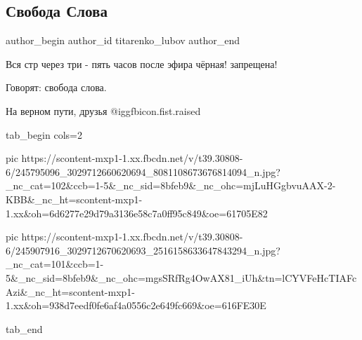  
 
 
 
 
 
\subsection{Свобода Слова}
\label{sec:15_10_2021.fb.titarenko_lubov.1.svoboda_slova}
 
\ifcmt
 author_begin
   author_id titarenko_lubov
 author_end
\fi

Вся стр  через три - пять часов  после эфира  чёрная! запрещена! 

Говорят: свобода слова.

На верном пути, друзья @igg{fbicon.fist.raised} 


\ifcmt
  tab_begin cols=2

     pic https://scontent-mxp1-1.xx.fbcdn.net/v/t39.30808-6/245795096_3029712660620694_8081108673676814094_n.jpg?_nc_cat=102&ccb=1-5&_nc_sid=8bfeb9&_nc_ohc=mjLuHGgbvuAAX-2-KBB&_nc_ht=scontent-mxp1-1.xx&oh=6d6277e29d79a3136e58c7a0ff95c849&oe=61705E82

     pic https://scontent-mxp1-1.xx.fbcdn.net/v/t39.30808-6/245907916_3029712670620693_2516158633647843294_n.jpg?_nc_cat=101&ccb=1-5&_nc_sid=8bfeb9&_nc_ohc=mgsSRfRg4OwAX81_iUh&tn=lCYVFeHcTIAFcAzi&_nc_ht=scontent-mxp1-1.xx&oh=938d7eedf0fe6af4a0556c2e649fc669&oe=616FE30E

  tab_end
\fi

